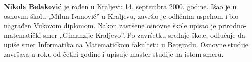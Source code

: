 \documentclass[12pt,oneside]{memoir}
\begin{document}
\begin{biografija}
  \textbf{Nikola Belaković} je rođen u Kraljevu 14. septembra 2000. godine.
  Išao je u osnovnu školu „Milun Ivanović” u Kraljevu, završio je odličnim uspehom
  i bio nagrađen Vukovom diplomom. Nakon završene osnovne škole
  upisao je prirodno-matematički smer „Gimanzije Kraljevo”.
  Po završetku srednje škole, odlučuje da upiše smer Informatika na Matematičkom fakultetu u Beogradu.
  Osnovne studije završava u roku od četiri godine i upisuje master studije na istom smeru.
  

\end{biografija}
\end{document}
